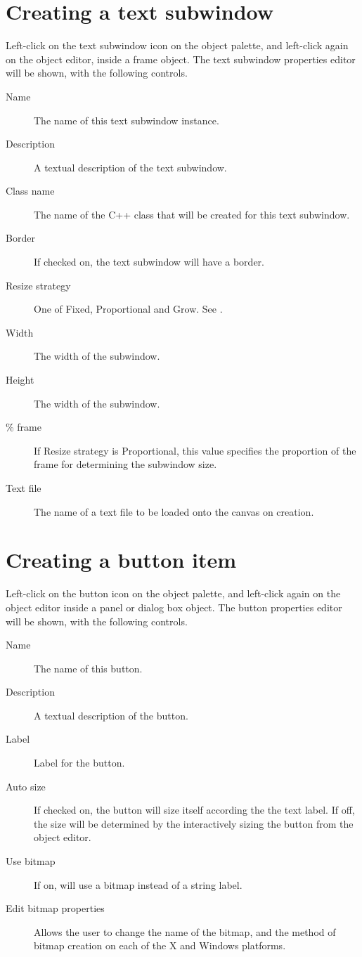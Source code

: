 \section{Creating a text subwindow}

Left-click on the text subwindow icon on the object palette, and left-click
again on the object editor, inside a frame object. The text subwindow properties
editor will be shown, with the following controls.

\begin{description}
\item[Name] The name of this text subwindow instance.
\item[Description] A textual description of the text subwindow.
\item[Class name] The name of the C++ class that will be created for
this text subwindow.
\item[Border] If checked on, the text subwindow will have a border.
\item[Resize strategy] One of Fixed, Proportional and Grow.
See .
\item[Width] The width of the subwindow.
\item[Height] The width of the subwindow.
\item[\% frame] If Resize strategy is Proportional, this value specifies
the proportion of the frame for determining the subwindow size.
\item[Text file] The name of a text file to be loaded onto the canvas on creation.
\end{description}

\section{Creating a button item}

Left-click on the button icon on the object palette, and left-click
again on the object editor inside a panel or dialog box object. The
button properties editor will be shown, with the following
controls.

\begin{description}
\item[Name] The name of this button.
\item[Description] A textual description of the button.
\item[Label] Label for the button.
\item[Auto size] If checked on, the button will size itself according the
the text label. If off, the size will be determined by the interactively sizing
the button from the object editor.
\item[Use bitmap] If on, will use a bitmap instead of a string label.
\item[Edit bitmap properties] Allows the user to change the name of the bitmap,
and the method of bitmap creation on each of the X and Windows platforms.
\end{description}

